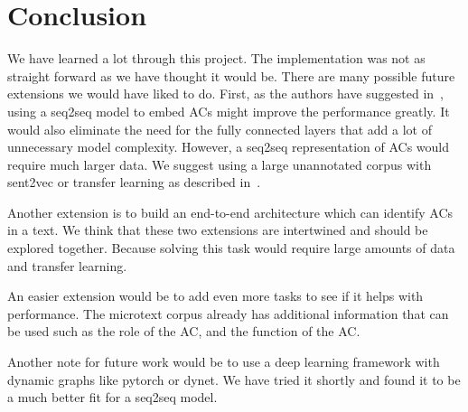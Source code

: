 \documentclass[onecolumn]{article}
\begin{document}
\section{Conclusion}
We have learned a lot through this project.
The implementation was not as straight forward as we have thought it would be.
There are many possible future extensions we would have liked to do.
First, as the authors have suggested in~\cite{potash2017here}, using a seq2seq model to embed ACs might improve the performance greatly.
It would also eliminate the need for the fully connected layers that add a lot of unnecessary model complexity.
However, a seq2seq representation of ACs would require much larger data.
We suggest using a large unannotated corpus with sent2vec or transfer learning as described in~\cite{sent}.

Another extension is to build an end-to-end architecture which can identify ACs in a text.
We think that these two extensions are intertwined and should be explored together.
Because solving this task would require large amounts of data and transfer learning.

An easier extension would be to add even more tasks to see if it helps with performance.
The microtext corpus already has additional information that can be used such as the role of the AC, and the function of the AC.

Another note for future work would be to use a deep learning framework with dynamic graphs like pytorch or dynet.
We have tried it shortly and found it to be a much better fit for a seq2seq model.

\nocite{*}


\end{document}
